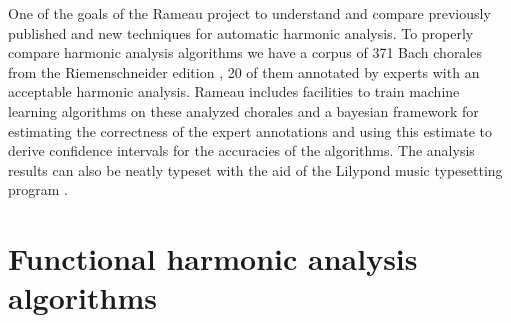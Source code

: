 
One of the goals of the Rameau project to understand and compare
previously published and new techniques for automatic harmonic
analysis. To properly compare harmonic analysis algorithms we have a
corpus of 371 Bach chorales from the Riemenschneider edition
\cite{bach41:371}, 20 of them annotated by experts with an acceptable
harmonic analysis. Rameau includes facilities to train machine
learning algorithms on these analyzed chorales and a bayesian
framework for estimating the correctness of the expert annotations and
using this estimate to derive confidence intervals for the accuracies
of the algorithms. The analysis results can also be neatly typeset with
the aid of the Lilypond music typesetting program
\cite{nienhuys.ea08:lilypond}.

\section{Functional harmonic analysis algorithms}
\label{sec:algorithms}

